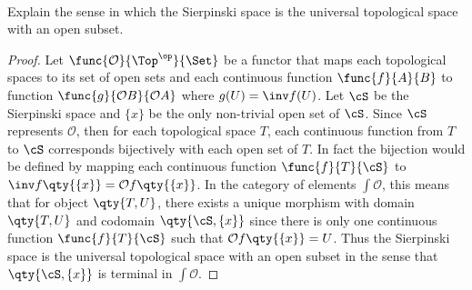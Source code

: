 \documentclass[../../main]{subfiles}
\begin{document}
	
\paragraph{}

	\begin{exercise}
		
	Explain the sense in which the Sierpinski space is the universal topological
	space with an open subset.
		
	\end{exercise}
	
	
	\begin{proof}
		
		Let $\func{\mathcal{O}}{\Top^{\op} }{\Set}$ be a functor that
		maps each topological spaces to its set of open sets and each
		continuous function $\func{f}{A}{B}$ to function
		$\func{g}{\mathcal{O}B}{\mathcal{O}A}$ where $g(U) = \inv
		f(U)$. Let $\cS$ be the Sierpinski space and $\{x\}$ be the
		only non-trivial open set of $\cS$. Since $\cS$ represents
		$\mathcal{O}$, then for each topological space $T$, each
		continuous function from $T$ to $\cS$ corresponds bijectively
		with each open set of $T$. In fact the bijection would be
		defined by mapping each continuous function $\func{f}{T}{\cS}$
		to $\inv f\qty{\{x\}} = \mathcal{O}f\qty{\{x\}}$. In the
		category of elements $\int \mathcal{O} $, this means that for
		object $\qty{T,U}$, there exists a unique morphism with domain
		$\qty{T,U}$ and codomain $\qty{\cS, \{x\}}$ since there is only
		one continuous function $\func{f}{T}{\cS}$ such that
		$\mathcal{O}f\qty{\{x\}} = U$. Thus the Sierpinski space is the
		universal topological space with an open subset in the sense
		that $\qty{\cS,\{x\}}$ is terminal in $\int \mathcal{O} $.
	
		
	\end{proof}
\end{document}
